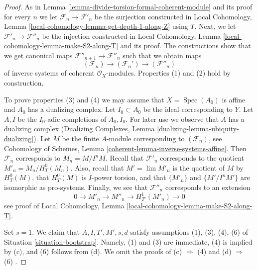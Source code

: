 \documentclass{stacks-project}
\theoremstyle{plain}
\theoremstyle{definition}
\theoremstyle{remark}
\numberwithin{equation}{subsection}
\def\lim{\mathop{\mathrm{lim}}\nolimits}
\def\Spec{\mathop{\mathrm{Spec}}}
\begin{document}
\begin{proof}
As in Lemma \ref{lemma-divide-torsion-formal-coherent-module} and its proof
for every $n$ we let $\mathcal{F}_n \to \mathcal{F}'_n$ be the surjection
constructed in
Local Cohomology, Lemma \ref{local-cohomology-lemma-get-depth-1-along-Z}
using $T$.
Next, we let $\mathcal{F}'_n \to \mathcal{F}''_n$ be the injection
constructed in
Local Cohomology, Lemma \ref{local-cohomology-lemma-make-S2-along-T}
and its proof. The constructions show that we get canonical maps
$\mathcal{F}''_{n + 1} \to \mathcal{F}''_n$ such that we obtain
maps
$$
(\mathcal{F}_n) \longrightarrow (\mathcal{F}_n') \longrightarrow
(\mathcal{F}''_n)
$$
of inverse systems of coherent $\mathcal{O}_X$-modules.
Properties (1) and (2) hold by construction.

\medskip\noindent
To prove properties (3) and (4) we may assume that $X = \Spec(A_0)$ is
affine and $A_0$ has a dualizing complex. Let $I_0 \subset A_0$ be the
ideal corresponding to $Y$. Let $A, I$ be the $I_0$-adic completions of
$A_0, I_0$. For later use we observe that $A$ has a dualizing complex
(Dualizing Complexes, Lemma \ref{dualizing-lemma-ubiquity-dualizing}).
Let $M$ be the finite $A$-module corresponding to $(\mathcal{F}_n)$, see
Cohomology of Schemes, Lemma \ref{coherent-lemma-inverse-systems-affine}.
Then $\mathcal{F}_n$ corresponds to $M_n = M/I^nM$. Recall that
$\mathcal{F}'_n$ corresponds to the quotient $M'_n = M_n / H^0_T(M_n)$.
Also, recall that $M' = \lim M'_n$ is the quotient of $M$ by
$H^0_T(M)$, that $H^0_T(M)$ is $I$-power torsion, and that
$\{M'_n\}$ and $\{M'/I^nM'\}$ are isomorphic as pro-systems.
Finally, we see that $\mathcal{F}''_n$ corresponds to an extension
$$
0 \to M'_n \to M''_n \to H^1_{T'}(M'_n) \to 0
$$
see proof of
Local Cohomology, Lemma \ref{local-cohomology-lemma-make-S2-along-T}.

\medskip\noindent
Set $s = 1$. We claim that $A, I, T', M', s, d$ satisfy assumptions
(1), (3), (4), (6) of Situation \ref{situation-bootstrap}. Namely, (1) and (3)
are immediate, (4) is implied by (c), and (6) follows from (d).
We omit the proofs of (c) $\Rightarrow$ (4) and (d) $\Rightarrow$ (6) .


\end{proof}
\end{document}
